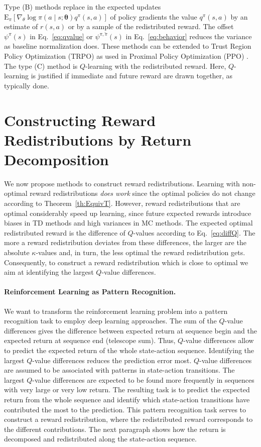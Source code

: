 \documentclass{article}
\newcommand\Bth{\bm{\theta}}
\newcommand\EXP{\mathbf{\mathrm{E}}}
\begin{document}
Type (B) methods replace in the expected updates  
$\EXP_{\pi}\left[ \nabla_{\theta} \log \pi(a \mid s;\Bth)  
q^\pi(s,a) \right]$ of policy gradients the value $q^\pi(s,a)$ 
by an estimate of $r(s,a)$ or by
a sample of the redistributed reward. 
The offset $\psi^{\pi}(s)$ in Eq.~\eqref{eq:qvalue}
or  $\psi^{\pi,\breve{\pi}}(s)$ in Eq.~\eqref{eq:behavior}
reduces the variance as baseline normalization does. 
These methods can be extended to Trust Region Policy
Optimization (TRPO) \cite{Schulman:15icml} as used in 
Proximal Policy Optimization (PPO) \cite{Schulman:17}.
The type (C) method is $Q$-learning with the redistributed reward. 
Here, $Q$-learning is justified if
immediate and future reward are drawn together,
as typically done.


\section{Constructing Reward Redistributions by Return Decomposition}


We now propose methods to construct reward redistributions. 
Learning with non-optimal reward redistributions {\em does work} since the 
optimal policies do not change according to Theorem~\ref{th:EquivT}.
However, reward redistributions that are optimal considerably speed up learning,
since future expected rewards introduce 
biases in TD methods and high variances in MC methods.
The expected optimal redistributed reward is 
the difference of $Q$-values according to Eq.~\eqref{eq:diffQ}. 
The more a reward redistribution deviates from these differences,
the larger are the absolute $\kappa$-values and, in turn, the less optimal
the reward redistribution gets.
Consequently, to construct a reward redistribution which is close to optimal
we aim at identifying the largest $Q$-value differences.


\paragraph{Reinforcement Learning as Pattern Recognition.}
We want to transform the reinforcement learning problem into
a pattern recognition task to employ deep learning approaches.
The sum of the $Q$-value differences gives the 
difference between expected return at sequence begin and
the expected return at sequence end (telescope sum).
Thus, $Q$-value differences allow to predict the 
expected return of the whole state-action sequence.
Identifying the largest $Q$-value differences 
reduces the prediction error most.
$Q$-value differences are assumed to be associated with
patterns in state-action transitions.
The largest $Q$-value differences 
are expected to be found more frequently in sequences
with very large or very low return.
The resulting task is to predict the expected return
from the whole sequence and identify which 
state-action transitions have contributed the most to the prediction.
This pattern recognition task serves to
construct a reward redistribution, where the redistributed reward
corresponds to the different contributions.
The next paragraph shows how the return is decomposed and redistributed
along the state-action sequence.
\end{document}

